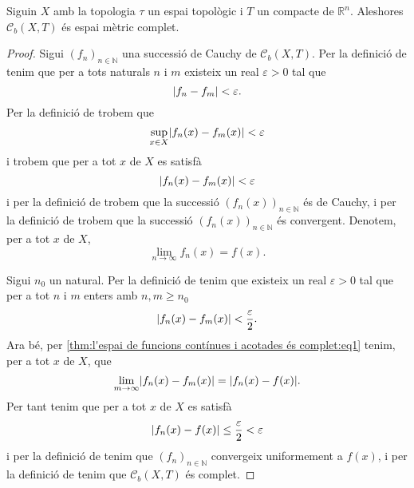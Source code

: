 \documentclass[../Apunts.tex]{subfiles}
\begin{document}
	\begin{theorem}
		\label{thm:l'espai de funcions contínues i acotades és complet}
		Siguin \(X\) amb la topologia \(\tau\) un espai topològic i \(T\) un compacte de \(\mathbb{R}^{n}\). Aleshores \(\mathcal{C}_{b}(X,T)\) és espai mètric complet.
		\begin{proof}
			Sigui \((f_{n})_{n\in\mathbb{N}}\) una successió de Cauchy de \(\mathcal{C}_{b}(X,T)\). Per la definició de  tenim que per a tots naturals \(n\) i \(m\) existeix un real \(\varepsilon>0\) tal que
			\[\norm{f_{n}-f_{m}}<\varepsilon.\]
			Per la definició de  trobem que
			\[\sup_{x\in X}\norm{f_{n}(x)-f_{m}(x)}<\varepsilon\]
			i trobem que per a tot \(x\) de \(X\) es satisfà
			\[\norm{f_{n}(x)-f_{m}(x)}<\varepsilon\]
			i per la definició de  trobem que la successió \((f_{n}(x))_{n\in\mathbb{N}}\) és de Cauchy, i per la definició de  trobem que la successió \((f_{n}(x))_{n\in\mathbb{N}}\) és convergent. Denotem, per a tot \(x\) de \(X\),
			\begin{equation}
				\label{thm:l'espai de funcions contínues i acotades és complet:eq1}
				\lim_{n\to\infty}f_{n}(x)=f(x).
			\end{equation}
			
			Sigui \(n_{0}\) un natural. Per la definició de  tenim que existeix un real \(\varepsilon>0\) tal que per a tot \(n\) i \(m\) enters amb \(n,m\geq n_{0}\)
			\[\norm{f_{n}(x)-f_{m}(x)}<\frac{\varepsilon}{2}.\]
			Ara bé, per \eqref{thm:l'espai de funcions contínues i acotades és complet:eq1} tenim, per a tot \(x\) de \(X\), que
			\[\lim_{m\to\infty}\norm{f_{n}(x)-f_{m}(x)}=\norm{f_{n}(x)-f(x)}.\]
			Per tant tenim que per a tot \(x\) de \(X\) es satisfà
			\[\norm{f_{n}(x)-f(x)}\leq\frac{\varepsilon}{2}<\varepsilon\]
			i per la definició de  tenim que \((f_{n})_{n\in\mathbb{N}}\) convergeix uniformement a \(f(x)\), i per la definició de  tenim que \(\mathcal{C}_{b}(X,T)\) és complet.
		\end{proof}
	\end{theorem}
\end{document}
